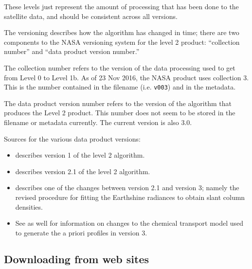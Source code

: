 \documentclass[12pt]{article}
\begin{document}
	These levels just represent the amount of processing that has been done to the satellite data, and should be consistent across all versions.
	
	\vspace{1em}
	The versioning describes how the algorithm has changed in time; there are two components to the NASA versioning system for the level 2 product: ``collection number'' and ``data product version number.'' 
	
	The collection number refers to the version of the data processing used to get from Level 0 to Level 1b. As of 23 Nov 2016, the NASA product uses collection 3.  This is the number contained in the filename (i.e. \texttt{v003}) and in the metadata.
	
	The data product version number refers to the version of the algorithm that produces the Level 2 product. This number does not seem to be stored in the filename or metadata currently. The current version is also 3.0.
	
	Sources for the various data product versions:
	\begin{itemize}
	\item \citet{bucsela06} describes version 1 of the level 2 algorithm.
	\item \citet{bucsela13} describes version 2.1 of the level 2 algorithm.
	\item \citet{marchenko15} describes one of the changes between version 2.1 and version 3; namely the revised procedure for fitting the Earthshine radiances to obtain slant column densities.
	\item See \citet{omi-readme} as well for information on changes to the chemical transport model used to generate the  a priori profiles in version 3.
	\end{itemize}
	
	\subsection{Downloading from web sites}
	
\end{document}

